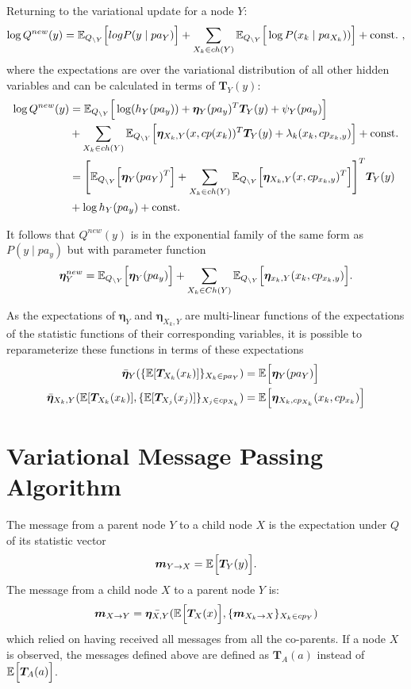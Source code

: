 Returning to the variational update for a node \( Y \):
\[
     \log Q^{new}(y) = \mathbb{E}_{Q_{\backslash Y}}\Big[log P(y \mid pa_Y)\Big] + \sum_{X_k \in ch(Y)}\mathbb{E}_{Q_{\backslash Y}}\Big[\log P(x_k \mid pa_{X_k}))\Big] + \text{const.} \ ,
\]
where the expectations are over the variational distribution of all other hidden variables and can be calculated in terms of \( \bm{T}_Y(y) \):
\[
    \begin{aligned}
     \log Q^{new}(y) &= \mathbb{E}_{Q_{\backslash Y}}\Big[\log(h_Y (pa_y)) + \bm{\eta}_Y(pa_y)^T \bm{T}_Y(y) + \psi_Y(pa_y)\Big]\\
     &+ \sum_{X_k \in ch(Y)} \mathbb{E}_{Q_{\backslash Y}}\Big[ \bm{\eta}_{X_k, Y}(x, cp(x_k))^T \bm{T}_Y(y) + \lambda_{k}(x_k, cp_{x_{k},y}) \Big] + \text{const.}\\
     &= \Bigg[ \mathbb{E}_{Q_{\backslash Y}}\Big[\bm{\eta}_Y(pa_Y)^T\Big] + \sum_{X_k \in ch(Y)} \mathbb{E}_{Q_{\backslash Y}}\Big[ \bm{\eta}_{X_k, Y}(x, cp_{x_k,y})^T\Big]  \Bigg]^T \bm{T}_Y(y) \\
     & + \log h_{Y}(pa_y)+ \text{const.}
    \end{aligned}   
\]

It follows that \( Q^{new}(y) \) is in the exponential family of the same form as \( P(y \mid pa_y) \) but with parameter function
\[
     \bm{\eta}^{new}_Y = \mathbb{E}_{Q_{\backslash Y}}\Big[\bm{\eta}_Y(pa_y)\Big] + \sum_{X_k \in Ch(Y)}\mathbb{E}_{Q_{\backslash Y}}\Big[\bm{\eta}_{x_k, Y}(x_k, cp_{x_{k},y})\Big].
\] 

As the expectations of \( \bm{\eta}_Y \) and \( \bm{\eta}_{X_k, Y} \) are multi-linear functions of the expectations of the statistic functions of their corresponding variables, it is possible to reparameterize these functions in terms of these expectations
\[
     \begin{aligned}
     \bar{\bm{\eta}}_Y (\{ \mathbb{E}[{\bm{T}_{X_k}}(x_k)] \}_{X_k \in pa_Y}) &= \mathbb{E}_{}\Big[\bm{\eta}_Y(pa_Y)\Big]\\
     \bar{\bm{\eta}}_{X_k,Y} (  \mathbb{E}[\bm{T}_{X_k}(x_k)], \{ \mathbb{E}[{\bm{T}_{X_j}}(x_j)] \}_{X_j \in cp_{X_k}}) &= \mathbb{E}_{}\Big[\bm{\eta}_{X_k, cp_{X_k}}(x_k, cp_{x_k})\Big]\\
     \end{aligned}
\] 

\section{Variational Message Passing Algorithm}

The message from a parent node \( Y \) to a child node \( X \) is the expectation under \( Q \) of its statistic vector
\[
      \bm{m}_{Y \to X} = \mathbb{E}_{}\Big[\bm{T}_Y(y)\Big].
\]
The message from a child node \( X \) to a parent node \( Y \) is:
\[
      \bm{m}_{X \to Y} = \bar{\bm{\eta}_{X,Y}}(\mathbb{E}_{}\Big[\bm{T}_X(x)\Big], \{\bm{m}_{X_k \to X}\}_{X_k\in cp_Y})
\]
which relied on having received all messages from all the co-parents. If a node \( X \)  is observed, the messages defined above are defined as \( \bm{T}_A(a) \) instead of \( \mathbb{E}_{}\Big[\bm{T}_A(a)\Big] \).

